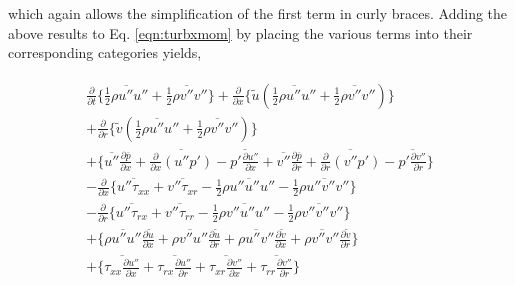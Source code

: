 	which again allows the simplification of the first term in curly braces.  Adding the above results to
Eq. \ref{eqn:turbxmom} by placing the various terms into their corresponding categories yields,

\begin{equation}
   \begin{array}{ccc}
      \begin{array}{c}
	\frac{\partial}{\partial t}\Big\{\overline{\frac{1}{2}\rho u'' u''} + \overline{\frac{1}{2}\rho v'' v''}\Big\}	
	+\frac{\partial}{\partial x}\Big\{\tilde u (\overline{\frac{1}{2}\rho u'' u''} 
	+ \overline{\frac{1}{2}\rho v'' v''})\Big\} \\
	+\frac{\partial}{\partial r}\Big\{\tilde v (\overline{\frac{1}{2}\rho u'' u''} 
	+ \overline{\frac{1}{2}\rho v'' v''})\Big\}\\

	+ \Big\{ \overline{u''}\frac{\partial \overline{p}}{\partial x} + \overline{\frac{\partial}{\partial x}(u''p')} 
	- \overline {p'\frac{\partial u''}{\partial x}} + \overline{v''}\frac{\partial \overline{p}}{\partial r} + 
	\overline{\frac{\partial}{\partial r}(v''p')} - \overline {p'\frac{\partial v''}{\partial r}} \Big\} \\

	-\frac{\partial}{\partial x}\Big\{ \overline{u''\tau_{xx}} + \overline{v''\tau_{xr}}
	- \frac{1}{2}\overline{\rho u'' u'' u''} - \frac{1}{2}\overline{\rho u'' v'' v''}\Big\} \\

	-\frac{\partial}{\partial r}\Big\{ \overline{u''\tau_{rx}} +  \overline{v''\tau_{rr}} 
	- \frac{1}{2}\overline{\rho v'' u'' u''} - \frac{1}{2}\overline{\rho v'' v'' v''}\Big\} \\

	+ \Big\{\overline{\rho u'' u''}\frac{\partial \tilde u}{\partial x} + \overline{\rho v'' u''}
	\frac{\partial \tilde u}{\partial r} + \overline{\rho u'' v''}\frac{\partial \tilde v}{\partial x}
	+ \overline{\rho v'' v''}\frac{\partial \tilde v}{\partial r}  \Big\} \\

	+ \Big\{\overline{\tau_{xx}\frac{\partial u''}{\partial x}} + \overline{\tau_{rx}\frac{\partial u''}{\partial r}}
	+ \overline{\tau_{xr}\frac{\partial v''}{\partial x}} + \overline{\tau_{rr}\frac{\partial v''}{\partial r}} \Big\} \\


\end{array}
\end{array}
\end{equation}
